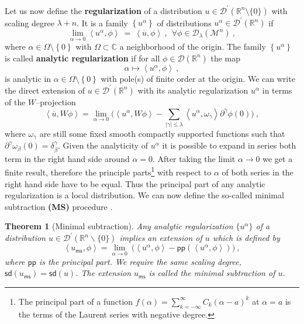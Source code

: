 \documentclass[11pt]{book}
\newcommand{\pp}{\mathsf{pp}}
\newcommand{\ms}{\mathsf{ms}}
\newcommand{\sd}{\mathsf{sd}}
\newcommand{\abs}[1]{\left|#1\right|}
\newcommand{\sm}[1]{\left\langle#1\right\rangle}
\newcommand{\Dcal}{\mathcal{D}}
\newcommand{\Mcal}{\mathcal{M}}
\newcommand{\Rbb}{\mathbb{R}}
\theoremstyle{break}
\newtheorem{theorem}{Theorem}[chapter]
\begin{document}
Let us now define the \textbf{regularization} of a distribution $u \in \Dcal^\prime(\Rbb^n\setminus \{0\})$ with scaling degree $\lambda+n$. It is a family $\left\{ u^{\alpha}\right\}$ of distributions $u^{\alpha}\in\Dcal^\prime(\Rbb^n)$ if
%
\begin{equation*}
\lim_{\alpha \to 0} \sm{u^{\alpha},\phi} \ = \ \sm{\overline{u},\phi} \ , \ \ \forall \phi \in \Dcal_{\lambda}(\Mcal^n) \ , 
\end{equation*}
%
where $\alpha \in \Omega\setminus\left\{ 0\right\}$ with $\Omega\subset\mathbb{C}$ a neighborhood of the origin. The family $\left\{ u^{\alpha}\right\}$ is called \textbf{analytic regularization} if for all $\phi \in \Dcal(\Rbb^n)$ the map 
% 
\begin{equation*}
\alpha \mapsto \sm{u^{\alpha},\phi} \ , 
\end{equation*}
%
is analytic in $\alpha\in\Omega\setminus\left\{ 0\right\}$ with pole(s) of finite order at the origin. We can write the direct extension of $u\in\Dcal^\prime(\Rbb^n)$ with its analytic regularization $u^\alpha$ in terms of the $W$--projection
%
\begin{equation*}
\sm{\overline{u} , W \phi} = \lim_{\alpha \to 0} \bigg( \sm{u^\alpha , W \phi} -  \sum_{\abs{\gamma}\leq\lambda} \sm{ u^\alpha , \omega_\gamma } \partial^\gamma \phi(0) \bigg) \ ,
\end{equation*}
%
where $\omega_\gamma$ are still some fixed smooth compactly supported functions such that $\partial^\gamma\omega_\beta(0) = \delta^\gamma_\beta$. Given the analyticity of $u^\alpha$ it is possible to expand in series both term in the right hand side around $\alpha=0$. After taking the limit $\alpha \to 0$ we get a finite result, therefore the principle parts\footnote{The principal part of a function $f(\alpha) = \sum_{k=-\infty}^\infty C_k (\alpha-a)^k$ at $\alpha=a$ is the terms of the Laurent series with negative degree.} with respect to $\alpha$ of both series in the right hand side have to be equal. Thus the principal part of any analytic regularization is a local distribution. We can now define the so-called minimal subtraction \textbf{(MS)} procedure \cite{DFKR_2014}.


\begin{theorem}[Minimal subtraction]\label{theo:ms_mumeric}
Any analytic regularization $\{u^\alpha\}$ of a distribution $u \in \Dcal^\prime(\Rbb^n \backslash \{0\})$ implies an extension of $u$ which is defined by 
%
\begin{equation*}
\sm{u_\ms,\phi} = \lim_{\alpha \to 0} \ \bigg( \sm{u^\alpha , \phi} - \pp\left(\sm{u^\alpha , \phi}\right) \bigg) \ ,
\end{equation*}
%
where $\pp$ is the principal part. We require the same scaling degree, $\sd(u_\ms) = \sd(u)$. The extension $u_\ms$ is called the minimal subtraction of $u$.
\end{theorem}
\end{document}
